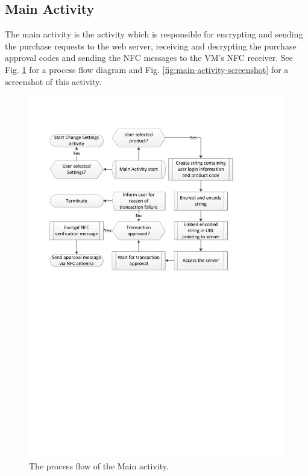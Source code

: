 \subsection{Main Activity}

The main activity is the activity which is responsible for encrypting and
sending the purchase requests to the web server, receiving and decrypting
the purchase approval codes and sending the NFC messages to the VM's
NFC receiver. See Fig. \ref{fig:main-activity} for a process flow diagram
and Fig. \ref{fig:main-activity-screenshot} for a screenshot of this activity.

\begin{figure}
 \centering 
 \includegraphics[clip = true, trim = 0 430 50 70,
 scale=0.7]{app_main_processflow}
 \caption{The process flow of the Main activity.}
 \label{fig:main-activity}
\end{figure}

